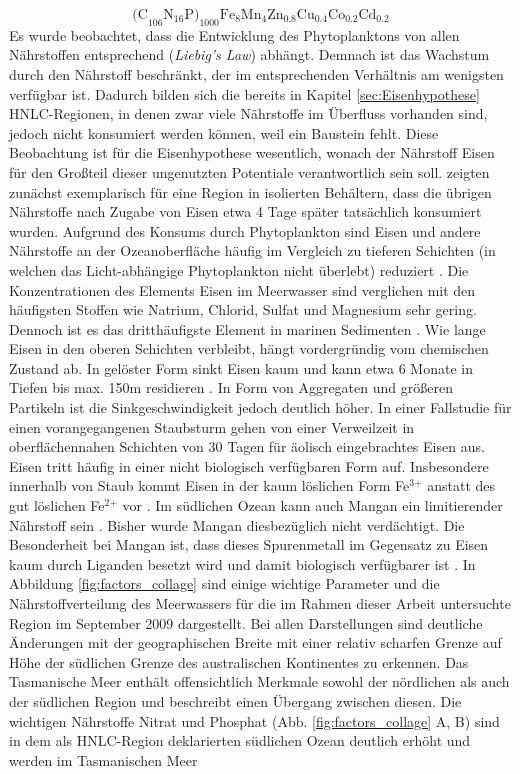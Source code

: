 \documentclass[12pt,a4paper,onecolumn,headheight=30pt]{scrartcl}
\begin{document}
\begin{equation}
\text{(C}_{106} \text{N}_{16} \text{P)}_{1000} \text{Fe}_8\text{Mn}_4\text{Zn}_{0.8}\text{Cu}_{0.4}\text{Co}_{0.2} \text{Cd}_{0.2} \label{eq;stochio}
\end{equation}
Es wurde beobachtet, dass die Entwicklung des Phytoplanktons von allen Nährstoffen entsprechend (\textit{Liebig's Law}) abhängt. Demnach ist das Wachstum durch den Nährstoff beschränkt, der im entsprechenden Verhältnis am wenigsten verfügbar ist. Dadurch bilden sich die bereits in Kapitel \ref{sec:Eisenhypothese} HNLC-Regionen, in denen zwar viele Nährstoffe im Überfluss vorhanden sind, jedoch nicht konsumiert werden können, weil ein Baustein fehlt. Diese Beobachtung ist für die Eisenhypothese wesentlich, wonach der Nährstoff Eisen für den Großteil dieser ungenutzten Potentiale verantwortlich sein soll. \citet{Martin.1988} zeigten zunächst exemplarisch für eine Region in isolierten Behältern, dass die übrigen Nährstoffe nach Zugabe von Eisen etwa 4 Tage später tatsächlich konsumiert wurden. Aufgrund des Konsums durch Phytoplankton sind Eisen und andere Nährstoffe an der Ozeanoberfläche häufig im Vergleich zu tieferen Schichten (in welchen das Licht-abhängige Phytoplankton nicht überlebt) reduziert \citep{Martin.1990}. Die Konzentrationen des Elements Eisen im Meerwasser sind verglichen mit den häufigsten Stoffen wie Natrium, Chlorid, Sulfat und Magnesium sehr gering. Dennoch ist es das dritthäufigste Element in marinen Sedimenten \citep{Emerson.2009}. Wie lange Eisen in den oberen Schichten verbleibt, hängt vordergründig vom chemischen Zustand ab. In gelöster Form sinkt Eisen kaum und kann etwa 6 Monate in Tiefen bis max. 150m residieren \citep{Hayes.2015}. In Form von Aggregaten und größeren Partikeln ist die Sinkgeschwindigkeit jedoch deutlich höher. In einer Fallstudie für einen vorangegangenen Staubsturm gehen \citet{Boyd.2010} von einer Verweilzeit in oberflächennahen Schichten von 30 Tagen für äolisch eingebrachtes Eisen aus. Eisen tritt häufig in einer nicht biologisch verfügbaren Form auf. Insbesondere innerhalb von Staub kommt Eisen in der kaum löslichen Form Fe$^\text{3+}$ anstatt des gut löslichen Fe$^\text{2+}$ vor \citep{Reynolds.2014}. Im südlichen Ozean kann auch Mangan ein limitierender Nährstoff sein \citep{Browning.2021}. Bisher wurde Mangan diesbezüglich nicht verdächtigt. Die Besonderheit bei Mangan ist, dass dieses Spurenmetall im Gegensatz zu Eisen kaum durch Liganden besetzt wird und damit biologisch verfügbarer ist \citep{Emerson.2009}. In Abbildung \ref{fig:factors_collage} sind einige wichtige Parameter und die Nährstoffverteilung des Meerwassers für die im Rahmen dieser Arbeit untersuchte Region im September 2009 dargestellt. Bei allen Darstellungen sind deutliche Änderungen mit der geographischen Breite mit einer relativ scharfen Grenze auf Höhe der südlichen Grenze des australischen Kontinentes zu erkennen. Das Tasmanische Meer enthält offensichtlich Merkmale sowohl der nördlichen als auch der südlichen Region und beschreibt einen Übergang zwischen diesen. Die wichtigen Nährstoffe Nitrat und Phosphat (Abb. \ref{fig:factors_collage} A, B) sind in dem als HNLC-Region deklarierten südlichen Ozean deutlich erhöht und werden im Tasmanischen Meer 
\end{document}
